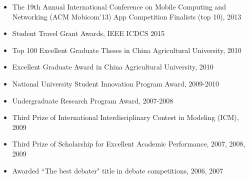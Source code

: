 \documentclass[letter]{article}
\newenvironment{tightitem}
{\begin{itemize}
\setlength{\itemsep}{1pt}
\setlength{\parskip}{0pt}
\setlength{\parsep}{0pt}}
{\end{itemize}}
\begin{document}
\begin{description}
\begin{tightitem}
\item The 19th Annual International Conference on Mobile Computing and Networking (ACM Mobicom'13) App Competition Finalists (top 10), 2013
\item Student Travel Grant Awards, IEEE ICDCS 2015
\item Top 100 Excellent Graduate Theses in China Agricultural University, 2010
\item  Excellent Graduate Award in China Agricultural University, 2010
\item   National University Student Innovation Program Award, 2009-2010
\item  Undergraduate Research Program Award, 2007-2008
\item Third Prize of International Interdisciplinary Contest in Modeling (ICM), 2009
\item  Third Prize of Scholarship for Excellent Academic Performance, 2007, 2008, 2009
\item Awarded ``The best debater"  title in debate competitions, 2006, 2007
\end{tightitem}


\end{description}
\end{document}
